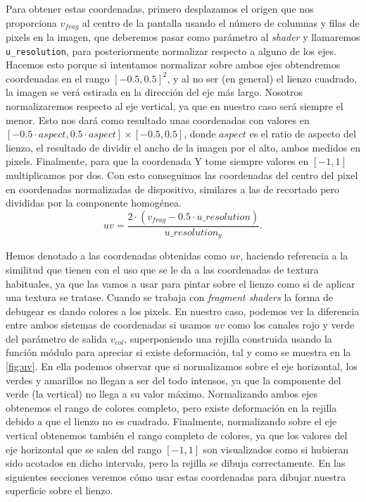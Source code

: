 Para obtener estas coordenadas, primero desplazamos el origen que nos proporciona $v_{frag}$ al centro de la pantalla usando el número de columnas y filas de pixels en la imagen, que deberemos pasar como parámetro al \textit{shader} y llamaremos \texttt{u\_resolution}, para posteriormente normalizar respecto a alguno de los ejes. Hacemos esto porque si intentamos normalizar sobre ambos ejes obtendremos coordenadas en el rango $[-0.5,0.5]^2$, y al no ser (en general) el lienzo cuadrado, la imagen se verá estirada en la dirección del eje más largo. Nosotros normalizaremos respecto al eje vertical, ya que en nuestro caso será siempre el menor. Esto nos dará como resultado unas coordenadas con valores en $\left[ -0.5\cdot aspect, 0.5\cdot aspect \right] \times [-0.5, 0.5]$, donde $aspect$ es el ratio de aspecto del lienzo, el resultado de dividir el ancho de la imagen por el alto, ambos medidos en pixels. Finalmente, para que la coordenada Y tome siempre valores en $[-1,1]$ multiplicamos por dos. Con esto conseguimos las coordenadas del centro del pixel en coordenadas normalizadas de dispositivo, similares a las de recortado pero divididas por la componente homogénea.
\begin{equation*}
    uv = \frac{2\cdot(v_{frag} - 0.5\cdot u\_resolution)}{u\_resolution_y}.
\end{equation*}

Hemos denotado a las coordenadas obtenidas como $uv$, haciendo referencia a la similitud que tienen con el uso que se le da a las coordenadas de textura habituales, ya que las vamos a usar para pintar sobre el lienzo como si de aplicar una textura se tratase. Cuando se trabaja con \textit{fragment shaders} la forma de debugear es dando colores a los pixels. En nuestro caso, podemos ver la diferencia entre ambos sistemas de coordenadas si usamos $uv$ como los canales rojo y verde del parámetro de salida $v_{col}$, superponiendo una rejilla construida usando la función módulo para apreciar si existe deformación, tal y como se muestra en la \autoref{fig:uv}. En ella podemos observar que si normalizamos sobre el eje horizontal, los verdes y amarillos no llegan a ser del todo intensos, ya que la componente del verde (la vertical) no llega a su valor máximo. Normalizando ambos ejes obtenemos el rango de colores completo, pero existe deformación en la rejilla debido a que el lienzo no es cuadrado. Finalmente, normalizando sobre el eje vertical obtenemos también el rango completo de colores, ya que los valores del eje horizontal que se salen del rango $[-1,1]$ son visualizados como si hubieran sido acotados en dicho intervalo, pero la rejilla se dibuja correctamente. En las siguientes secciones veremos cómo usar estas coordenadas para dibujar nuestra superficie sobre el lienzo.
\newline

